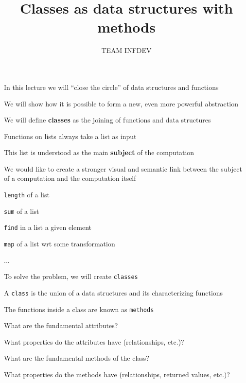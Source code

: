 \documentclass{beamer}
\title{Classes as data structures with methods}
\author{TEAM INFDEV}
\institute{Hogeschool Rotterdam \\ 
Rotterdam, Netherlands}
\date{}
\begin{document}
\maketitle

\begin{slide}{
\item In this lecture we will ``close the circle'' of data structures and functions
\item We will show how it is possible to form a new, even more powerful abstraction
\item We will define \textbf{classes} as the joining of functions and data structures
}\end{slide}

\begin{slide}{
\item Functions on lists always take a list as input
\item This list is understood as the main \textbf{subject} of the computation
\item We would like to create a stronger visual and semantic link between the subject of a computation and the computation itself
}\end{slide}

\begin{slide}{
\item \texttt{length} of a list
\item \texttt{sum} of a list
\item \texttt{find} in a list a given element
\item \texttt{map} of a list wrt some transformation
\item ...
}\end{slide}

\begin{slide}{
\item To solve the problem, we will create \texttt{classes}
\item A \texttt{class} is the union of a data structures and its characterizing functions
\item The functions inside a class are known as \texttt{methods}
}\end{slide}

\begin{slide}{
\item What are the fundamental attributes?
\item What properties do the attributes have (relationships, etc.)?
\item What are the fundamental methods of the class?
\item What properties do the methods have (relationships, returned values, etc.)?
}\end{slide}
\end{document}
